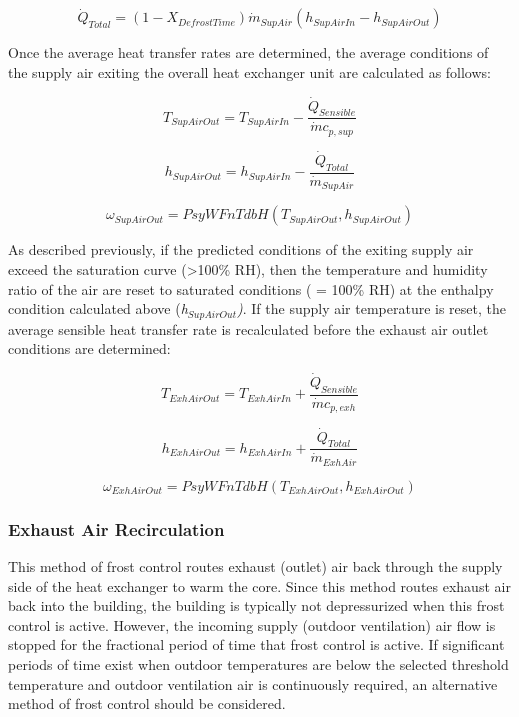 \begin{equation}
{\dot{Q}_{Total}} = (1 - {X_{DefrostTime}}){\dot{m}_{SupAir}}({h_{SupAirIn}} - {h_{SupAirOut}})
\end{equation}

Once the average heat transfer rates are determined, the average conditions of the supply air exiting the overall heat exchanger unit are calculated as follows:

\begin{equation}
{T_{SupAirOut}} = {T_{SupAirIn}} - \frac{\dot{Q}_{Sensible}}{\dot{m} c_{p,sup}}
\end{equation}

\begin{equation}
{h_{SupAirOut}} = {h_{SupAirIn}} - \frac{\dot{Q}_{Total}}{\dot{m}_{SupAir}}
\end{equation}

\begin{equation}
{\omega_{SupAirOut}} = PsyWFnTdbH({T_{SupAirOut}},{h_{SupAirOut}})
\end{equation}

As described previously, if the predicted conditions of the exiting supply air exceed the saturation curve (\textgreater{}100\% RH), then the temperature and humidity ratio of the air are reset to saturated conditions ( = 100\% RH) at the enthalpy condition calculated above (\emph{h\(_{SupAirOut}\))}. If the supply air temperature is reset, the average sensible heat transfer rate is recalculated before the exhaust air outlet conditions are determined:

\begin{equation}
{T_{ExhAirOut}} = {T_{ExhAirIn}} + \frac{\dot{Q}_{Sensible}}{\dot{m} c_{p,exh}}
\end{equation}

\begin{equation}
{h_{ExhAirOut}} = {h_{ExhAirIn}} + \frac{\dot{Q}_{Total}}{\dot{m}_{ExhAir}}
\end{equation}

\begin{equation}
{\omega_{ExhAirOut}} = PsyWFnTdbH({T_{ExhAirOut}},{h_{ExhAirOut}})
\end{equation}

\subsubsection{Exhaust Air Recirculation}\label{exhaust-air-recirculation}

This method of frost control routes exhaust (outlet) air back through the supply side of the heat exchanger to warm the core. Since this method routes exhaust air back into the building, the building is typically not depressurized when this frost control is active. However, the incoming supply (outdoor ventilation) air flow is stopped for the fractional period of time that frost control is active. If significant periods of time exist when outdoor temperatures are below the selected threshold temperature and outdoor ventilation air is continuously required, an alternative method of frost control should be considered.

